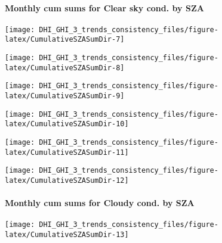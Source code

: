 \documentclass[
  10pt,
  a4paper,oneside]{article}
\begin{document}
\hypertarget{monthly-cum-sums-for-clear-sky-cond.-by-sza-1}{%
\paragraph{Monthly cum sums for Clear sky cond. by SZA}\label{monthly-cum-sums-for-clear-sky-cond.-by-sza-1}}

\begin{center}\texttt{[image: DHI\_GHI\_3\_trends\_consistency\_files/figure-latex/CumulativeSZASumDir-7]} \end{center}

\begin{center}\texttt{[image: DHI\_GHI\_3\_trends\_consistency\_files/figure-latex/CumulativeSZASumDir-8]} \end{center}

\begin{center}\texttt{[image: DHI\_GHI\_3\_trends\_consistency\_files/figure-latex/CumulativeSZASumDir-9]} \end{center}

\begin{center}\texttt{[image: DHI\_GHI\_3\_trends\_consistency\_files/figure-latex/CumulativeSZASumDir-10]} \end{center}

\begin{center}\texttt{[image: DHI\_GHI\_3\_trends\_consistency\_files/figure-latex/CumulativeSZASumDir-11]} \end{center}

\begin{center}\texttt{[image: DHI\_GHI\_3\_trends\_consistency\_files/figure-latex/CumulativeSZASumDir-12]} \end{center}

\newpage

\FloatBarrier

\hypertarget{monthly-cum-sums-for-cloudy-cond.-by-sza-1}{%
\paragraph{Monthly cum sums for Cloudy cond. by SZA}\label{monthly-cum-sums-for-cloudy-cond.-by-sza-1}}

\begin{center}\texttt{[image: DHI\_GHI\_3\_trends\_consistency\_files/figure-latex/CumulativeSZASumDir-13]} \end{center}
\end{document}
